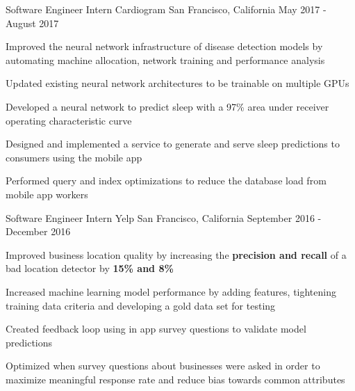 


\begin{cventries}


\cventry
{Software Engineer Intern}
{Cardiogram}
{San Francisco, California}
{May 2017 - August 2017}
{ %
\begin{cvitems}
\item {Improved the neural network infrastructure of disease detection models by automating machine allocation, network training and performance analysis}
\item {Updated existing neural network architectures to be trainable on multiple GPUs}
\item {Developed a neural network to predict sleep with a 97\% area under receiver operating characteristic curve}
\item {Designed and implemented a service to generate and serve sleep predictions to consumers using the mobile app}
\item {Performed query and index optimizations to reduce the database load from mobile app workers}
\end{cvitems}
}


\cventry
{Software Engineer Intern}
{Yelp}
{San Francisco, California}
{September 2016 - December 2016}
{ %
\begin{cvitems}
\item {Improved business location quality by increasing the \textbf{precision and recall} of a bad location detector by \textbf{15\% and 8\%}}
\item {Increased machine learning model performance by adding features, tightening training data criteria and developing a gold data set for testing}
\item {Created feedback loop using in app survey questions to validate model predictions}
\item {Optimized when survey questions about businesses were asked in order to maximize meaningful response rate and reduce bias towards common attributes}
\end{cvitems}
}


\end{cventries}
